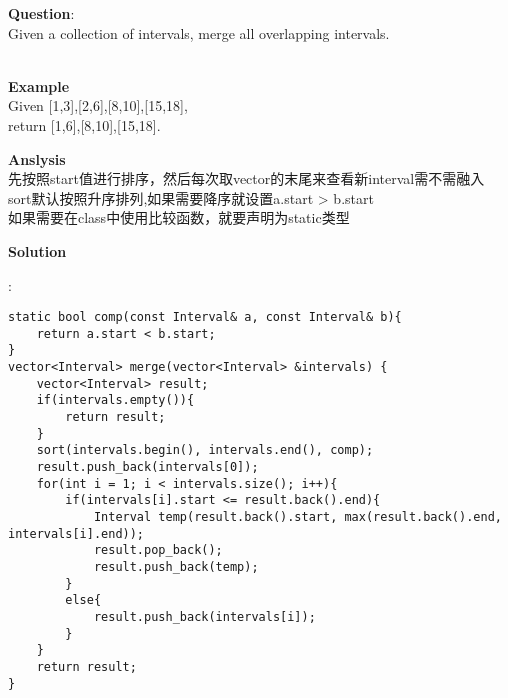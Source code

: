     
\begin{description}
    \item{\textbf{Question}}:\\%
		Given a collection of intervals, merge all overlapping intervals.\\\

    \item{\textbf{Example}}\\
		Given [1,3],[2,6],[8,10],[15,18],\\
		return [1,6],[8,10],[15,18].\\

    \item{\textbf{Anslysis}}\\
		先按照start值进行排序，然后每次取vector的末尾来查看新interval需不需融入\\
		sort默认按照升序排列,如果需要降序就设置a.start > b.start\\
		如果需要在class中使用比较函数，就要声明为static类型\\

    \item{\textbf{Solution}}\\
	\item{} : \\
		\begin{lstlisting}
static bool comp(const Interval& a, const Interval& b){
    return a.start < b.start;
}
vector<Interval> merge(vector<Interval> &intervals) {
    vector<Interval> result;
    if(intervals.empty()){
        return result;
    }
    sort(intervals.begin(), intervals.end(), comp);
    result.push_back(intervals[0]);
    for(int i = 1; i < intervals.size(); i++){
        if(intervals[i].start <= result.back().end){
            Interval temp(result.back().start, max(result.back().end, intervals[i].end));
            result.pop_back();
            result.push_back(temp);
        }
        else{
            result.push_back(intervals[i]);
        }
    }
    return result;
}
		\end{lstlisting}

\end{description}

